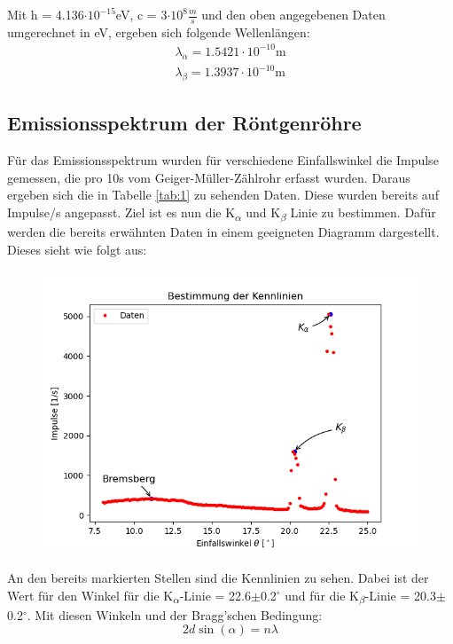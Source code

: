 Mit h = 4.136$\cdot 10^{-15}$eV, c = 3$\cdot 10^{8} \frac{m}{s}$ und den oben angegebenen Daten umgerechnet in eV, ergeben sich folgende Wellenlängen:
\begin{align}
    \lambda_{\alpha} = 1.5421\cdot 10^{-10} \text{m} \nonumber \\
    \lambda_{\beta} = 1.3937\cdot 10^{-10} \text{m} \nonumber
\end{align}

\subsection{Emissionsspektrum der Röntgenröhre}

Für das Emissionsspektrum wurden für verschiedene Einfallswinkel die Impulse gemessen, die pro 10s vom Geiger-Müller-Zählrohr erfasst wurden. Daraus ergeben sich die in Tabelle \ref{tab:1} zu sehenden Daten. Diese wurden bereits auf Impulse/s angepasst. Ziel ist es nun die K\textsubscript{$\alpha$} und K\textsubscript{$\beta$} Linie zu bestimmen. Dafür werden die bereits erwähnten Daten in einem geeigneten Diagramm dargestellt. Dieses sieht wie folgt aus:

\begin{figure}[H]
    \centering
    \includegraphics{"a1.png"}
\end{figure}

\noindent An den bereits markierten Stellen sind die Kennlinien zu sehen. Dabei ist der Wert für den Winkel für die K\textsubscript{$\alpha$}-Linie = 22.6$\pm$0.2$^\circ$  und für die K\textsubscript{$\beta$}-Linie = 20.3$\pm$0.2$^\circ$.  Mit diesen Winkeln und der Bragg'schen Bedingung:
\begin{equation} \label{lambda}
    2d \sin(\alpha) = n\lambda 
\end{equation}

